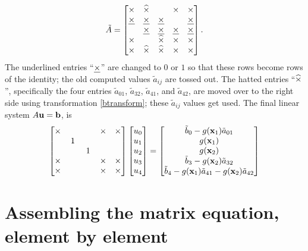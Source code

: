 \begin{example}
\begin{equation*}
\tilde A = \begin{bmatrix}
\times  & \widehat{\times} &     & \times  & \times \\
\underline{\times} & \underline{\times} & \underline{\times} &     & \underline{\times} \\
    & \underline{\times} & \underline{\times} & \underline{\times} & \underline{\times} \\
\times  &     & \widehat{\times} & \times  & \times \\
\times  & \widehat{\times} & \widehat{\times} & \times  & \times
\end{bmatrix}.
\end{equation*}
The underlined entries ``$\underline{\times}$'' are changed to $0$ or $1$ so that these rows become rows of the identity; the old computed values $\tilde a_{ij}$ are tossed out.  The hatted entries ``$\widehat{\times}$'', specifically the four entries $\tilde a_{01}$, $\tilde a_{32}$, $\tilde a_{41}$, and $\tilde a_{42}$, are moved over to the right side using transformation \eqref{btransform}; these $\tilde a_{ij}$ values get used.  The final linear system $A \mathbf{u} = \mathbf{b}$, is
\begin{equation*}
\begin{bmatrix}
\times & & & \times & \times \\
 & \,1\, & & & \\
 & & \,1\, & & \\
\times & & & \times & \times \\
\times & & & \times & \times
\end{bmatrix}
\begin{bmatrix}
u_0 \\
u_1 \\
u_2 \\
u_3 \\
u_4
\end{bmatrix}
=
\begin{bmatrix}
\tilde b_0 - g(\mathbf{x}_1) \tilde a_{01} \\
g(\mathbf{x}_1) \\
g(\mathbf{x}_2) \\
\tilde b_3 - g(\mathbf{x}_2) \tilde a_{32} \\
\tilde b_4 - g(\mathbf{x}_1) \tilde a_{41} - g(\mathbf{x}_2) \tilde a_{42}
\end{bmatrix}
\end{equation*}
\end{example}
\noindent\hrulefill

\bigskip


\section{Assembling the matrix equation, element by element}

